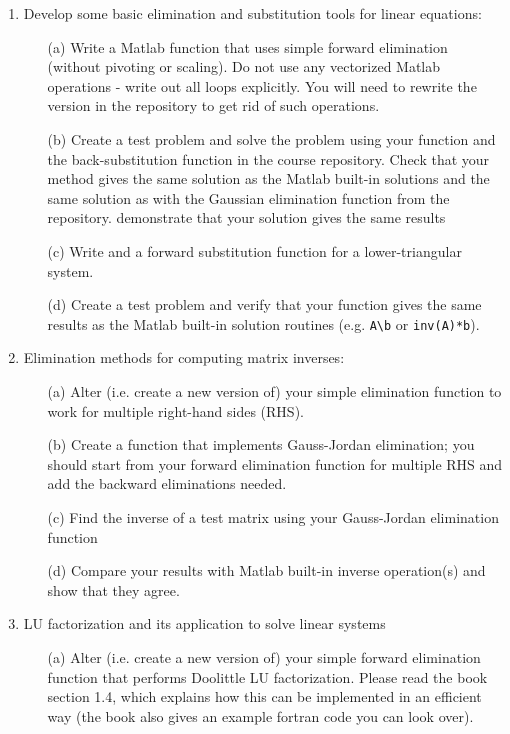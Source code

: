 \documentclass{article}
\begin{document}
\pagebreak

\begin{enumerate}
  \item Develop some basic elimination and substitution tools for linear equations:   
  \begin{itemize}
    \item[(a)] Write a Matlab function that uses simple forward elimination (without pivoting or scaling).  Do not use any vectorized Matlab operations - write out all loops explicitly.  You will need to rewrite the version in the repository to get rid of such operations.  
    \item[(b)] Create a test problem and solve the problem using your function and the back-substitution function in the course repository.   Check that your method gives the same solution as the Matlab built-in solutions and the same solution as with the Gaussian elimination function from the repository.  
    demonstrate that your solution gives the same results 
    \item[(c)] Write and a forward substitution function for a lower-triangular system.  
    \item[(d)] Create a test problem and verify that your function gives the same results as the Matlab built-in solution routines (e.g. \texttt{A\textbackslash b} or \texttt{inv(A)*b}).  
  \end{itemize}
  \item Elimination methods for computing matrix inverses:  
  \begin{itemize}
    \item[(a)] Alter (i.e. create a new version of) your simple elimination function to work for multiple right-hand sides (RHS).  
    \item[(b)] Create a function that implements Gauss-Jordan elimination; you should start from your forward elimination function for multiple RHS and add the backward eliminations needed.  
    \item[(c)] Find the inverse of a test matrix using your Gauss-Jordan elimination function
    \item[(d)] Compare your results with Matlab built-in inverse operation(s) and show that they agree.
  \end{itemize}
  \item LU factorization and its application to solve linear systems
  \begin{itemize}
    \item[(a)] Alter (i.e. create a new version of) your simple forward elimination function that performs Doolittle LU factorization.  Please read the book section 1.4, which explains how this can be implemented in an efficient way (the book also gives an example fortran code you can look over).  

\end{itemize}
\end{enumerate}
\end{document}
